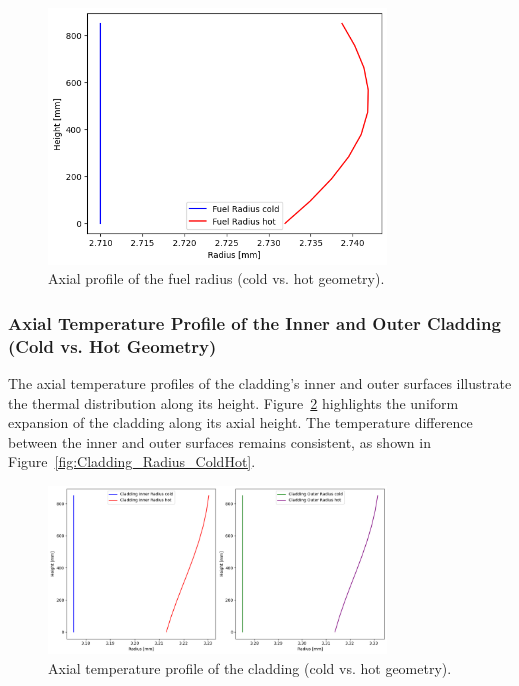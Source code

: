 \begin{figure}[H]
\centering
\includegraphics[width=0.8\textwidth]{1b_fuel_coldhot.png}
\caption{Axial profile of the fuel radius (cold vs. hot geometry).}
\label{fig:Fuel_Radius_ColdHot}
\end{figure}

\subsubsection{Axial Temperature Profile of the Inner and Outer Cladding (Cold vs. Hot Geometry)}

The axial temperature profiles of the cladding’s inner and outer surfaces illustrate the thermal distribution along its height. Figure~\ref{fig:Cladding_InOut_Temperature_Hot} highlights the uniform expansion of the cladding along its axial height. The temperature difference between the inner and outer surfaces remains consistent, as shown in Figure~\ref{fig:Cladding_Radius_ColdHot}.

\begin{figure}[H]
\centering
\includegraphics[width=0.8\textwidth]{2_cladding_in_out_coldhot.png}
\caption{Axial temperature profile of the cladding (cold vs. hot geometry).}
\label{fig:Cladding_InOut_Temperature_Hot}
\end{figure}

